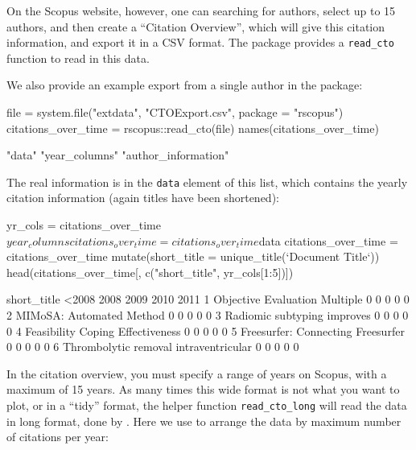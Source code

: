 On the Scopus website, however, one can searching for authors, select up
to 15 authors, and then create a ``Citation Overview'', which will give
this citation information, and export it in a CSV format. The
 package provides a \texttt{read\_cto} function to read in
this data.

We also provide an example export from a single author in the package:

\begin{Schunk}
\begin{Sinput}
file = system.file("extdata", "CTOExport.csv", package = "rscopus")
citations_over_time = rscopus::read_cto(file)
names(citations_over_time)
\end{Sinput}
\begin{Soutput}
[1] "data"               "year_columns"       "author_information"
\end{Soutput}
\end{Schunk}

The real information is in the \texttt{data} element of this list, which
contains the yearly citation information (again titles have been
shortened):

\begin{Schunk}
\begin{Sinput}
yr_cols = citations_over_time$year_columns
citations_over_time = citations_over_time$data
citations_over_time = citations_over_time %
  mutate(short_title = unique_title(`Document Title`))
head(citations_over_time[, c("short_title", yr_cols[1:5])])
\end{Sinput}
\begin{Soutput}
                            short_title <2008 2008 2009 2010 2011
1         Objective Evaluation Multiple     0    0    0    0    0
2              MIMoSA: Automated Method     0    0    0    0    0
3           Radiomic subtyping improves     0    0    0    0    0
4      Feasibility Coping Effectiveness     0    0    0    0    0
5     Freesurfer: Connecting Freesurfer     0    0    0    0    0
6 Thrombolytic removal intraventricular     0    0    0    0    0
\end{Soutput}
\end{Schunk}

In the citation overview, you must specify a range of years on Scopus,
with a maximum of 15 years. As many times this wide format is not what
you want to plot, or in a ``tidy'' format, the  helper
function \texttt{read\_cto\_long} will read the data in long format,
done by  \citep{tidyr}. Here we use  to
arrange the data by maximum number of citations per year:

